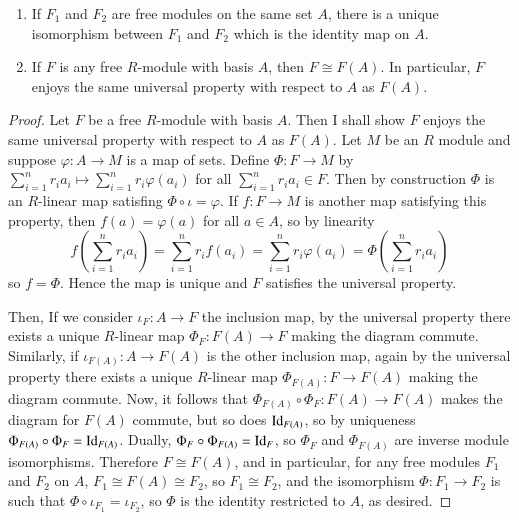 \begin{cor}
    \leavevmode
    \begin{enumerate}
        \item If $F_1$ and $F_2$ are free modules on the same set $A$, there is a unique isomorphism between $F_1$ and $F_2$ which is the identity map on $A$.
        \item If $F$ is any free $R$-module with basis $A$, then $F\cong F(A)$. In particular, $F$ enjoys the same universal property with respect to $A$ as $F(A)$.
    \end{enumerate}
\end{cor}
\begin{proof}
    Let $F$ be a free $R$-module with basis $A$. Then I shall show $F$ enjoys the same universal property with respect to $A$ as $F(A)$. Let $M$ be an $R$ module and suppose $\varphi:A\rightarrow M$ is a map of sets. Define $\Phi:F\rightarrow M$ by $\sum_{i=1}^nr_ia_i \mapsto \sum_{i=1}^nr_i\varphi(a_i)$ for all $\sum_{i=1}^nr_ia_i \in F$. Then by construction $\Phi$ is an $R$-linear map satisfing $\Phi\circ \iota = \varphi$. If $f:F\rightarrow M$ is another map satisfying this property, then $f(a) = \varphi(a)$ for all $a \in A$, so by linearity $$f\left(\sum_{i=1}^nr_ia_i\right) = \sum_{i=1}^nr_if(a_i) = \sum_{i=1}^nr_i\varphi(a_i) = \Phi\left(\sum_{i=1}^nr_ia_i\right)$$
    so $f = \Phi$. Hence the map is unique and $F$ satisfies the universal property. 

    Then, If we consider $\iota_F:A\rightarrow F$ the inclusion map, by the universal property there exists a unique $R$-linear map $\Phi_F:F(A) \rightarrow F$ making the diagram commute. Similarly, if $\iota_{F(A)}:A\rightarrow F(A)$ is the other inclusion map, again by the universal property there exists a unique $R$-linear map $\Phi_{F(A)}:F\rightarrow F(A)$ making the diagram commute. Now, it follows that $\Phi_{F(A)}\circ \Phi_F:F(A) \rightarrow F(A)$ makes the diagram for $F(A)$ commute, but so does $\operatorname{Id}_{F(A)}$, so by uniqueness $\Phi_{F(A)}\circ\Phi_F = \operatorname{Id}_{F(A)}$. Dually, $\Phi_F\circ \Phi_{F(A)} = \operatorname{Id}_F$, so $\Phi_F$ and $\Phi_{F(A)}$ are inverse module isomorphisms. Therefore $F\cong F(A)$, and in particular, for any free modules $F_1$ and $F_2$ on $A$, $F_1 \cong F(A) \cong F_2$, so $F_1 \cong F_2$, and the isomorphism $\Phi:F_1 \rightarrow F_2$ is such that $\Phi\circ \iota_{F_1} = \iota_{F_2}$, so $\Phi$ is the identity restricted to $A$, as desired.
\end{proof}


